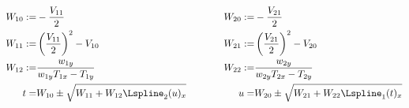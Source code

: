 $$\begin{aligned}
    W_{10} :=& -\frac{V_{11}}{2} & \hspace{1cm}
    W_{20} :=& -\frac{V_{21}}{2} \\
    W_{11} :=& \left(\frac{V_{11}}{2}\right)^2 - V_{10} & \hspace{1cm}
    W_{21} :=& \left(\frac{V_{21}}{2}\right)^2 - V_{20} \\
    W_{12} :=& \frac{w_{1y}}{ w_{1y}T_{1x}-T_{1y} } & \hspace{1cm}
    W_{22} :=& \frac{w_{2y}}{ w_{2y}T_{2x}-T_{2y} } \\
    t =& W_{10} \pm \sqrt{
        W_{11} + W_{12}\Lspline_2(u)_x
    } & \hspace{1cm}
    u =& W_{20} \pm \sqrt{
        W_{21} + W_{22}\Lspline_1(t)_x
    } \\

\end{aligned}$$
